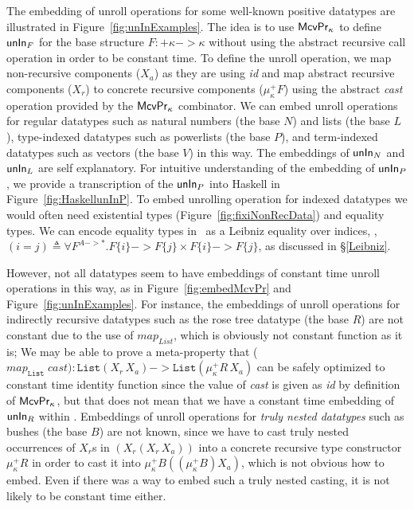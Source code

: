 The embedding of unroll operations for some well-known positive datatypes
are illustrated in Figure~\ref{fig:unInExamples}. The idea is to use
$\mathsf{McvPr}_\kappa$ to define $\mathsf{unIn}_F$ for the base structure
$F:+\kappa -> \kappa$ without using the abstract recursive call operation
in order to be constant time. To define the unroll operation, we map
non-recursive components ($X_a$) as they are using \textit{id} and map
abstract recursive components ($X_r$) to concrete recursive components
($\mu^{+}_\kappa F$) using the abstract \textit{cast} operation provided
by the $\mathsf{McvPr}_\kappa$ combinator. We can embed unroll operations
for regular datatypes such as natural numbers (the base $N$) and lists
(the base $L$), type-indexed datatypes such as powerlists (the base $P$),
and term-indexed datatypes such as vectors (the base $V$) in this way.
The embeddings of $\mathsf{unIn}_N$ and $\mathsf{unIn}_L$ are self explanatory.
For intuitive understanding of the embedding of $\mathsf{unIn}_P$, we provide
a transcription of the $\mathsf{unIn}_P$ into Haskell in Figure~\ref{fig:HaskellunInP}.
To embed unrolling operation for indexed datatypes we would often need
existential types (Figure~\ref{fig:fixiNonRecData}) and equality types.
We can encode equality types in \Fixi\ as a Leibniz equality over indices, \ie,
$(i=j) \triangleq \forall F^{A -> *}.F\{i\} -> F\{j\} \times F\{i\} -> F\{j\}$,
as discussed in \S\ref{Leibniz}.

However, not all datatypes seem to have embeddings of constant time 
unroll operations in this way, as in Figure~\ref{fig:embedMcvPr} and
Figure~\ref{fig:unInExamples}. For instance, the embeddings of
unroll operations for indirectly recursive datatypes such as
the rose tree datatype (the base $R$) are not constant due to the
use of $\textit{map}_\textit{List}$, which is obviously not constant
function as it is; We may be able to prove a meta-property that 
($\textit{map}_\texttt{List}\;\textit{cast}) : \texttt{List}(X_r\,X_a)
-> \texttt{List}(\mu^{+}_\kappa R\,X_a)$ can be safely optimized
to constant time identity function since the value of \textit{cast}
is given as \textit{id} by definition of $\mathsf{McvPr}_\kappa$, but that does
not mean that we have a constant time embedding of $\mathsf{unIn}_R$ within \Fixi.
Embeddings of unroll operations for \emph{truly nested datatypes}
such as bushes (the base $B$) are not known, since we have to cast
truly nested occurrences of $X_r$s in $(X_r(X_r\,X_a))$ into
a concrete recursive type constructor $\mu^{+}_\kappa R$ in order
to cast it into $\mu^{+}_\kappa B((\mu^{+}_\kappa B)X_a)$, which
is not obvious how to embed. Even if there was a way to embed such
a truly nested casting, it is not likely to be constant time either.

